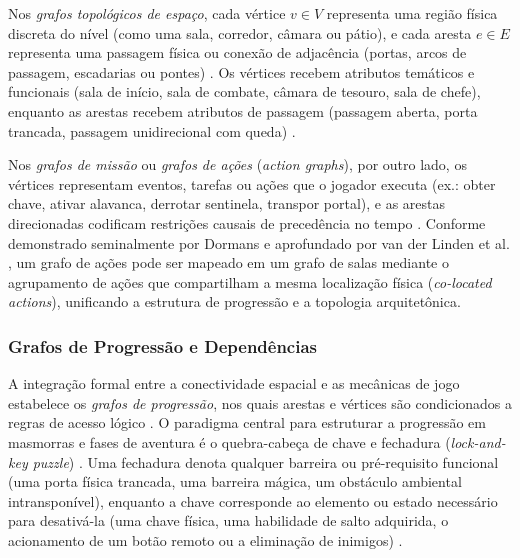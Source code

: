 Nos \textit{grafos topológicos de espaço}, cada vértice $v \in V$ representa uma região física discreta do nível (como uma sala, corredor, câmara ou pátio), e cada aresta $e \in E$ representa uma passagem física ou conexão de adjacência (portas, arcos de passagem, escadarias ou pontes) \cite{dormans2010, linden2014dungeons, summerville2018procedural}. Os vértices recebem atributos temáticos e funcionais (sala de início, sala de combate, câmara de tesouro, sala de chefe), enquanto as arestas recebem atributos de passagem (passagem aberta, porta trancada, passagem unidirecional com queda) \cite{linden2014dungeons, xu2025databasedrivenframework3dlevel}.

Nos \textit{grafos de missão} ou \textit{grafos de ações} (\textit{action graphs}), por outro lado, os vértices representam eventos, tarefas ou ações que o jogador executa (ex.: obter chave, ativar alavanca, derrotar sentinela, transpor portal), e as arestas direcionadas codificam restrições causais de precedência no tempo \cite{dormans2010, linden2013designing}. Conforme demonstrado seminalmente por Dormans \cite{dormans2010} e aprofundado por van der Linden et al. \cite{linden2013designing, linden2014dungeons}, um grafo de ações pode ser mapeado em um grafo de salas mediante o agrupamento de ações que compartilham a mesma localização física (\textit{co-located actions}), unificando a estrutura de progressão e a topologia arquitetônica.

\subsubsection{Grafos de Progressão e Dependências}
\label{sec:grafos_progressao}

A integração formal entre a conectividade espacial e as mecânicas de jogo estabelece os \textit{grafos de progressão}, nos quais arestas e vértices são condicionados a regras de acesso lógico \cite{dormans2010, linden2013designing, linden2014dungeons, xu2025databasedrivenframework3dlevel}. O paradigma central para estruturar a progressão em masmorras e fases de aventura é o quebra-cabeça de chave e fechadura (\textit{lock-and-key puzzle}) \cite{dormans2010, linden2014dungeons, xu2025databasedrivenframework3dlevel}. Uma fechadura denota qualquer barreira ou pré-requisito funcional (uma porta física trancada, uma barreira mágica, um obstáculo ambiental intransponível), enquanto a chave corresponde ao elemento ou estado necessário para desativá-la (uma chave física, uma habilidade de salto adquirida, o acionamento de um botão remoto ou a eliminação de inimigos) \cite{dormans2010, linden2013designing, shaker2016constructive}.


